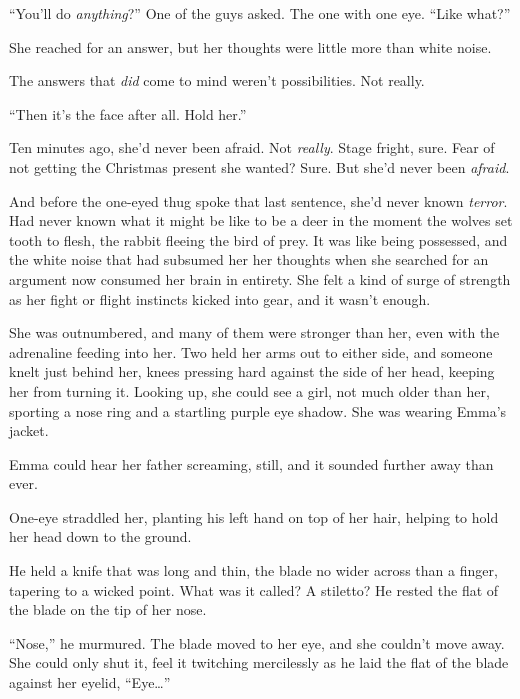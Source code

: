 ``You'll do \emph{anything}?'' One of the guys asked.  The one with one eye.  ``Like what?''



She reached for an answer, but her thoughts were little more than white noise.



The answers that \emph{did} come to mind weren't possibilities.  Not really.



``Then it's the face after all.  Hold her.''



Ten minutes ago, she'd never been afraid.  Not \emph{really}.  Stage fright, sure.  Fear of not getting the Christmas present she wanted?  Sure.  But she'd never been \emph{afraid}.



And before the one-eyed thug spoke that last sentence, she'd never known \emph{terror}.  Had never known what it might be like to be a deer in the moment the wolves set tooth to flesh, the rabbit fleeing the bird of prey.  It was like being possessed, and the white noise that had subsumed her her thoughts when she searched for an argument now consumed her brain in entirety.  She felt a kind of surge of strength as her fight or flight instincts kicked into gear, and it wasn't enough.



She was outnumbered, and many of them were stronger than her, even with the adrenaline feeding into her.  Two held her arms out to either side, and someone knelt just behind her, knees pressing hard against the side of her head, keeping her from turning it.  Looking up, she could see a girl, not much older than her, sporting a nose ring and a startling purple eye shadow.  She was wearing Emma's jacket.



Emma could hear her father screaming, still, and it sounded further away than ever.



One-eye straddled her, planting his left hand on top of her hair, helping to hold her head down to the ground.



He held a knife that was long and thin, the blade no wider across than a finger, tapering to a wicked point.  What was it called?  A stiletto?  He rested the flat of the blade on the tip of her nose.



``Nose,'' he murmured.  The blade moved to her eye, and she couldn't move away.  She could only shut it, feel it twitching mercilessly as he laid the flat of the blade against her eyelid, ``Eye\ldots''



